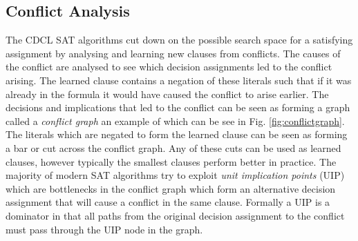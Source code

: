 \subsection*{Conflict Analysis}
The CDCL SAT algorithms cut down on the possible search space for a satisfying assignment by analysing and learning new clauses from conflicts. The causes of the conflict are analysed to see which decision assignments led to the conflict arising. The learned clause contains a negation of these literals such that if it was already in the formula it would have caused the conflict to arise earlier. The decisions and implications that led to the conflict can be seen as forming a graph called a \emph{conflict graph} an example of which can be see in Fig. \ref{fig:conflictgraph}. The literals which are negated to form the learned clause can be seen as forming a bar or cut across the conflict graph. Any of these cuts can be used as learned clauses, however typically the smallest clauses perform better in practice. The majority of modern SAT algorithms try to exploit \emph{unit implication points} (UIP) which are bottlenecks in the conflict graph which form an alternative decision assignment that will cause a conflict in the same clause. Formally a UIP is a dominator in that all paths from the  original decision assignment to the conflict must pass through the UIP node in the graph. 
\medskip
